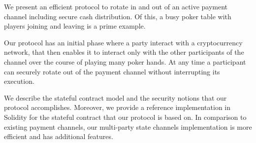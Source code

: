 We present an efficient protocol to rotate in and out of an active payment channel including secure cash distribution. Of this, a busy poker table with players joining and leaving is a prime example.
 
Our protocol has an initial phase where a party interact with a cryptocurrency network, that then enables it to interact only with the other participants of the channel over the course of playing many poker hands. At any time a participant can securely rotate out of the payment channel without interrupting its execution.
 
We describe the stateful contract model and the security notions that our protocol accomplishes. Moreover, we provide a reference implementation in Solidity for the stateful contract that our protocol is based on. In comparison to existing payment channels, our multi-party state channels implementation is more efficient and has additional features.
